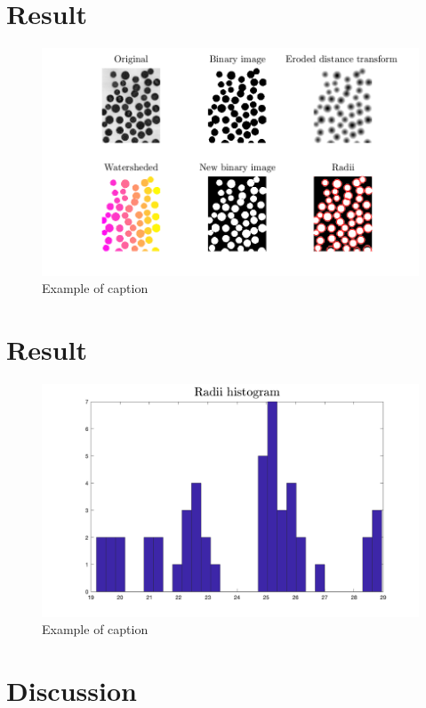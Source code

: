\documentclass[a4paper]{article}
\begin{document}
\section{Result}
\begin{figure}[ht!]
\centering
\includegraphics[width=130mm]{assign_3.png}
\caption{Example of caption}
\label{fig:example}
\end{figure}

\section{Result}
\begin{figure}[ht!]
\centering
\includegraphics[width=130mm]{assign_3b.png}
\caption{Example of caption}
\label{fig:example2}
\end{figure}


\section{Discussion}
\end{document}
